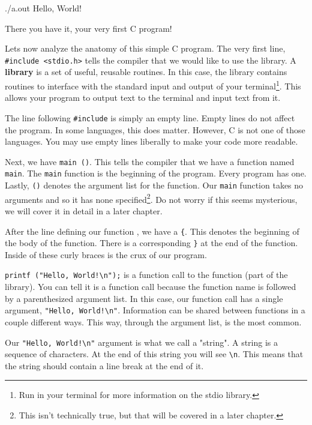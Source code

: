 \begin{Terminal}
./a.out
Hello, World!
\end{Terminal}

There you have it, your very first C program!

Lets now analyze the anatomy of this simple C program. The very first line,
\verb|#include <stdio.h>| tells the compiler that we would like to use the
 library. A \textbf{library} is a set of useful, reusable
routines. In this case, the  library contains routines to
interface with the standard input and output of your terminal\footnote{Run
 \rmfamily in your terminal for more information on the
stdio library.}.  This allows your program to output text to the terminal and
input text from it.

The line following \verb|#include| is simply an empty line. Empty lines do
not affect the program. In some languages, this does matter. However, C is not
one of those languages. You may use empty lines liberally to make your code
more readable.

Next, we have \verb|main ()|. This tells the compiler that we have a function
named \verb|main|. The \verb|main| function is the beginning of the program.
Every program has one. Lastly, \verb|()| denotes the argument list for the
function. Our \verb|main| function takes no arguments and so it has none
specified\footnote{This isn't technically true, but that will be covered in a
later chapter.}. Do not worry if this seems mysterious, we will cover it
in detail in a later chapter.

After the line defining our function , we have a \verb|{|. This
denotes the beginning of the body of the function. There is a corresponding
\verb|}| at the end of the function. Inside of these curly braces is the crux
of our program.

\verb|printf ("Hello, World!\n");| is a function call to the 
function (part of the  library). You can tell it is a function
call because the function name is followed by a parenthesized argument list.
In this case, our function call has a single argument,
\verb|"Hello, World!\n"|. Information can be shared between functions in
a couple different ways. This way, through the argument list, is the most
common.

Our \verb|"Hello, World!\n"| argument is what we call a "string". A string
is a sequence of characters. At the end of this string you will see \verb|\n|.
This means that the string should contain a line break at the end of it.

